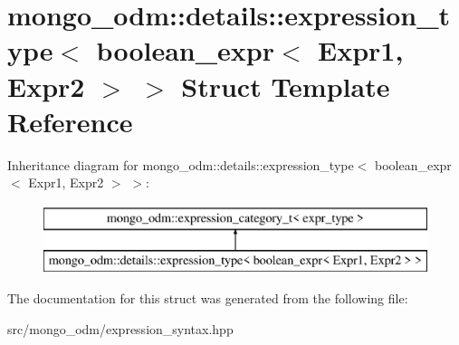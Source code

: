 \hypertarget{structmongo__odm_1_1details_1_1expression__type_3_01boolean__expr_3_01Expr1_00_01Expr2_01_4_01_4}{}\section{mongo\+\_\+odm\+:\+:details\+:\+:expression\+\_\+type$<$ boolean\+\_\+expr$<$ Expr1, Expr2 $>$ $>$ Struct Template Reference}
\label{structmongo__odm_1_1details_1_1expression__type_3_01boolean__expr_3_01Expr1_00_01Expr2_01_4_01_4}
Inheritance diagram for mongo\+\_\+odm\+:\+:details\+:\+:expression\+\_\+type$<$ boolean\+\_\+expr$<$ Expr1, Expr2 $>$ $>$\+:\begin{figure}[H]
\begin{center}
\leavevmode
\includegraphics[height=2.000000cm]{structmongo__odm_1_1details_1_1expression__type_3_01boolean__expr_3_01Expr1_00_01Expr2_01_4_01_4}
\end{center}
\end{figure}


The documentation for this struct was generated from the following file\+:\begin{DoxyCompactItemize}
\item 
src/mongo\+\_\+odm/expression\+\_\+syntax.\+hpp\end{DoxyCompactItemize}
